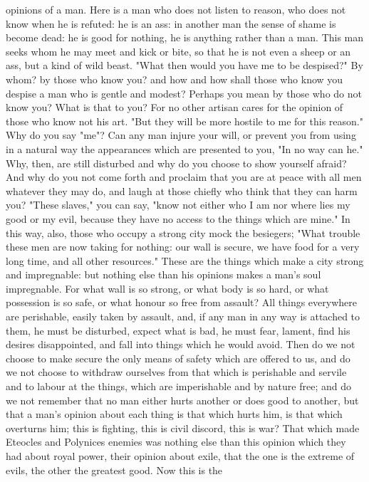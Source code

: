 \documentclass[a4paper]{article}
\begin{document}
opinions of a man. Here is a man who does not listen to reason, who does not
know when he is refuted: he is an ass: in another man the sense of shame is
become dead: he is good for nothing, he is anything rather than a man. This man
seeks whom he may meet and kick or bite, so that he is not even a sheep or an
ass, but a kind of wild beast.
    "What then would you have me to be despised?" By whom? by those who know
you? and how and how shall those who know you despise a man who is gentle and
modest? Perhaps you mean by those who do not know you? What is that to you? For
no other artisan cares for the opinion of those who know not his art. "But they
will be more hostile to me for this reason." Why do you say "me"? Can any man
injure your will, or prevent you from using in a natural way the appearances
which are presented to you, "In no way can he." Why, then, are still disturbed
and why do you choose to show yourself afraid? And why do you not come forth
and proclaim that you are at peace with all men whatever they may do, and laugh
at those chiefly who think that they can harm you? "These slaves," you can say,
"know not either who I am nor where lies my good or my evil, because they have
no access to the things which are mine."
    In this way, also, those who occupy a strong city mock the besiegers; "What
trouble these men are now taking for nothing: our wall is secure, we have food
for a very long time, and all other resources." These are the things which make
a city strong and impregnable: but nothing else than his opinions makes a man's
soul impregnable. For what wall is so strong, or what body is so hard, or what
possession is so safe, or what honour so free from assault? All things
everywhere are perishable, easily taken by assault, and, if any man in any way
is attached to them, he must be disturbed, expect what is bad, he must fear,
lament, find his desires disappointed, and fall into things which he would
avoid. Then do we not choose to make secure the only means of safety which are
offered to us, and do we not choose to withdraw ourselves from that which is
perishable and servile and to labour at the things, which are imperishable and
by nature free; and do we not remember that no man either hurts another or does
good to another, but that a man's opinion about each thing is that which hurts
him, is that which overturns him; this is fighting, this is civil discord, this
is war? That which made Eteocles and Polynices enemies was nothing else than
this opinion which they had about royal power, their opinion about exile, that
the one is the extreme of evils, the other the greatest good. Now this is the
\end{document}
